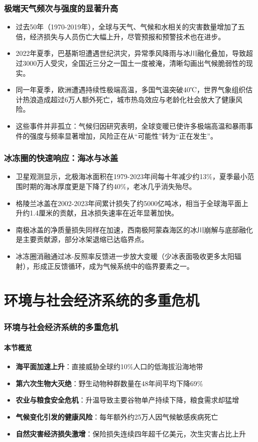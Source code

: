 \documentclass[11pt]{beamer}
\begin{document}
\begin{frame}
\frametitle{极端天气频次与强度的显著升高}
\begin{itemize}
    \item 过去50年（1970-2019年），全球与天气、气候和水相关的灾害数量增加了\alert{五倍}，经济损失与人员伤亡大幅上升，尽管预报和预警技术也在进步。
    \item 2022年夏季，巴基斯坦遭遇世纪洪灾，异常季风降雨与冰川融化叠加，导致\alert{超过3000万人受灾}，全国近三分之一国土一度被淹，清晰勾画出气候脆弱性的现实。
    \item 同一年夏季，欧洲遭遇持续性极端高温，多国气温突破40℃，世界气象组织估计热浪造成\alert{超过6万人额外死亡}，城市热岛效应与老龄化社会放大了健康风险。
    \item 这些事件并非孤立：气候归因研究表明，全球变暖已使许多极端高温和暴雨事件的强度与频率显著增加，风险正在从“可能性”转为“正在发生”。
\end{itemize}
\end{frame}

\begin{frame}
\frametitle{冰冻圈的快速响应：海冰与冰盖}
\begin{itemize}
    \item 卫星观测显示，北极海冰面积在1979-2023年间每十年减少约\alert{13\%}，夏季最小范围时期的海冰厚度更是下降了约\alert{40\%}，老冰几乎消失殆尽。
    \item 格陵兰冰盖在2002-2023年间累计损失了约\alert{5000亿吨冰}，相当于全球海平面上升约1.4厘米的贡献，且冰损失速率在近年显著加快。
    \item 南极冰盖的净质量损失同样在\alert{加速}，西南极阿蒙森海区的冰川崩解与底部融化是主要贡献源，部分冰架退缩已达临界点。
    \item 冰冻圈消融通过冰-反照率反馈进一步放大变暖（少冰表面吸收更多太阳辐射），形成\alert{正反馈循环}，成为气候系统中的临界要素之一。
\end{itemize}
\end{frame}

\section{环境与社会经济系统的多重危机}

\begin{frame}
\frametitle{环境与社会经济系统的多重危机}
\framesubtitle{本节概览}
\begin{itemize}
    \item \textbf{海平面加速上升}：直接威胁全球约10\%人口的低海拔沿海地带
    \item \textbf{第六次生物大灭绝}：野生动物种群数量在48年间平均下降69\%
    \item \textbf{农业与粮食安全危机}：升温导致主要谷物单产持续下降，粮食需求却猛增
    \item \textbf{气候变化引发的健康风险}：每年额外约25万人因气候敏感疾病死亡
    \item \textbf{自然灾害经济损失激增}：保险损失连续四年超千亿美元，次生灾害占比上升
\end{itemize}
\end{frame}
\end{document}
